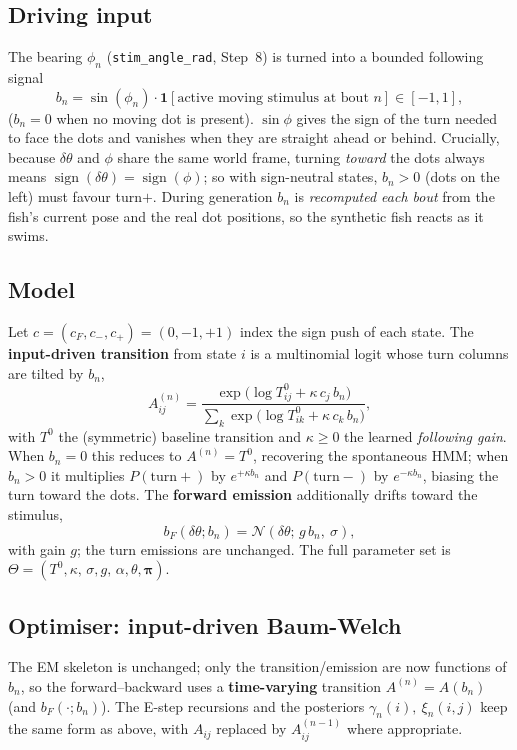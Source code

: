 \documentclass{article}
\begin{document}
\subsection{Driving input}
The bearing $\phi_n$ (\texttt{stim\_angle\_rad}, Step~8) is turned into a bounded
following signal
\[
b_n=\sin(\phi_n)\cdot\mathbf 1[\text{active moving stimulus at bout }n]
    \in[-1,1],
\]
($b_n=0$ when no moving dot is present). $\sin\phi$ gives the sign of the turn
needed to face the dots and vanishes when they are straight ahead or behind.
Crucially, because $\delta\theta$ and $\phi$ share the same world frame, turning
\emph{toward} the dots always means $\operatorname{sign}(\delta\theta)=\operatorname{sign}(\phi)$;
so with sign-neutral states, $b_n>0$ (dots on the left) must favour turn$+$.
During generation $b_n$ is \emph{recomputed each bout} from the fish's current
pose and the real dot positions, so the synthetic fish reacts as it swims.

\subsection{Model}
Let $c=(c_F,c_{-},c_{+})=(0,-1,+1)$ index the sign push of each state. The
\textbf{input-driven transition} from state $i$ is a multinomial logit whose turn
columns are tilted by $b_n$,
\[
A^{(n)}_{ij}=\frac{\exp\!\big(\log T^{0}_{ij}+\kappa\,c_j\,b_n\big)}
                  {\sum_{k}\exp\!\big(\log T^{0}_{ik}+\kappa\,c_k\,b_n\big)},
\]
with $T^0$ the (symmetric) baseline transition and $\kappa\ge0$ the learned
\emph{following gain}. When $b_n=0$ this reduces to $A^{(n)}=T^0$, recovering the
spontaneous HMM; when $b_n>0$ it multiplies $P(\text{turn}+)$ by $e^{+\kappa b_n}$
and $P(\text{turn}-)$ by $e^{-\kappa b_n}$, biasing the turn toward the dots. The
\textbf{forward emission} additionally drifts toward the stimulus,
\[
b_F(\delta\theta;b_n)=\mathcal N(\delta\theta;\,g\,b_n,\ \sigma),
\]
with gain $g$; the turn emissions are unchanged. The full parameter set is
$\Theta=(T^0,\kappa,\,\sigma,g,\,\alpha,\theta,\boldsymbol\pi)$.

\subsection{Optimiser: input-driven Baum-Welch}
The EM skeleton is unchanged; only the transition/emission are now functions of
$b_n$, so the forward--backward uses a \textbf{time-varying} transition
$A^{(n)}=A(b_n)$ (and $b_F(\cdot;b_n)$). The E-step recursions and the posteriors
$\gamma_n(i),\ \xi_n(i,j)$ keep the same form as above, with $A_{ij}$ replaced by
$A^{(n-1)}_{ij}$ where appropriate.
\end{document}
